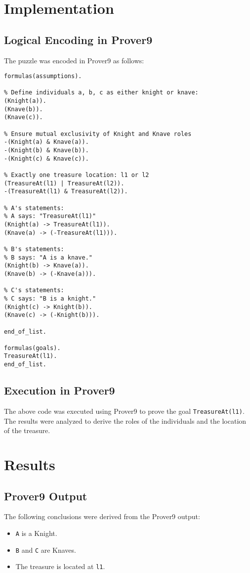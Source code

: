 \documentclass[a4paper,12pt]{article}
\begin{document}
\section{Implementation}
\subsection{Logical Encoding in Prover9}
The puzzle was encoded in Prover9 as follows:
\begin{lstlisting}[language=Prover9]
formulas(assumptions).

% Define individuals a, b, c as either knight or knave:
(Knight(a)).
(Knave(b)).
(Knave(c)).

% Ensure mutual exclusivity of Knight and Knave roles
-(Knight(a) & Knave(a)).
-(Knight(b) & Knave(b)).
-(Knight(c) & Knave(c)).

% Exactly one treasure location: l1 or l2
(TreasureAt(l1) | TreasureAt(l2)).
-(TreasureAt(l1) & TreasureAt(l2)).

% A's statements:
% A says: "TreasureAt(l1)"
(Knight(a) -> TreasureAt(l1)).
(Knave(a) -> (-TreasureAt(l1))).

% B's statements:
% B says: "A is a knave."
(Knight(b) -> Knave(a)).
(Knave(b) -> (-Knave(a))).

% C's statements:
% C says: "B is a knight."
(Knight(c) -> Knight(b)).
(Knave(c) -> (-Knight(b))).

end_of_list.

formulas(goals).
TreasureAt(l1).
end_of_list.
\end{lstlisting}

\subsection{Execution in Prover9}
The above code was executed using Prover9 to prove the goal \texttt{TreasureAt(l1)}. The results were analyzed to derive the roles of the individuals and the location of the treasure.

\section{Results}
\subsection{Prover9 Output}
The following conclusions were derived from the Prover9 output:
\begin{itemize}
    \item \texttt{A} is a Knight.
    \item \texttt{B} and \texttt{C} are Knaves.
    \item The treasure is located at \texttt{l1}.
\end{itemize}
\end{document}
